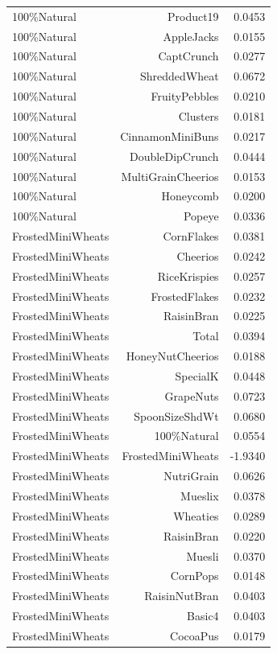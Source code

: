 \begin{longtable}{@{}lrr@{}}
100\%Natural & Product19 & 0.0453 \\
100\%Natural & AppleJacks & 0.0155 \\
100\%Natural & CaptCrunch & 0.0277 \\
100\%Natural & ShreddedWheat & 0.0672 \\
100\%Natural & FruityPebbles & 0.0210 \\
100\%Natural & Clusters & 0.0181 \\
100\%Natural & CinnamonMiniBuns & 0.0217 \\
100\%Natural & DoubleDipCrunch & 0.0444 \\
100\%Natural & MultiGrainCheerios & 0.0153 \\
100\%Natural & Honeycomb & 0.0200 \\
100\%Natural & Popeye & 0.0336 \\
FrostedMiniWheats & CornFlakes & 0.0381 \\
FrostedMiniWheats & Cheerios & 0.0242 \\
FrostedMiniWheats & RiceKrispies & 0.0257 \\
FrostedMiniWheats & FrostedFlakes & 0.0232 \\
FrostedMiniWheats & RaisinBran & 0.0225 \\
FrostedMiniWheats & Total & 0.0394 \\
FrostedMiniWheats & HoneyNutCheerios & 0.0188 \\
FrostedMiniWheats & SpecialK & 0.0448 \\
FrostedMiniWheats & GrapeNuts & 0.0723 \\
FrostedMiniWheats & SpoonSizeShdWt & 0.0680 \\
FrostedMiniWheats & 100\%Natural & 0.0554 \\
FrostedMiniWheats & FrostedMiniWheats & -1.9340 \\
FrostedMiniWheats & NutriGrain & 0.0626 \\
FrostedMiniWheats & Mueslix & 0.0378 \\
FrostedMiniWheats & Wheaties & 0.0289 \\
FrostedMiniWheats & RaisinBran & 0.0220 \\
FrostedMiniWheats & Muesli & 0.0370 \\
FrostedMiniWheats & CornPops & 0.0148 \\
FrostedMiniWheats & RaisinNutBran & 0.0403 \\
FrostedMiniWheats & Basic4 & 0.0403 \\
FrostedMiniWheats & CocoaPus & 0.0179 \\

\end{longtable}
